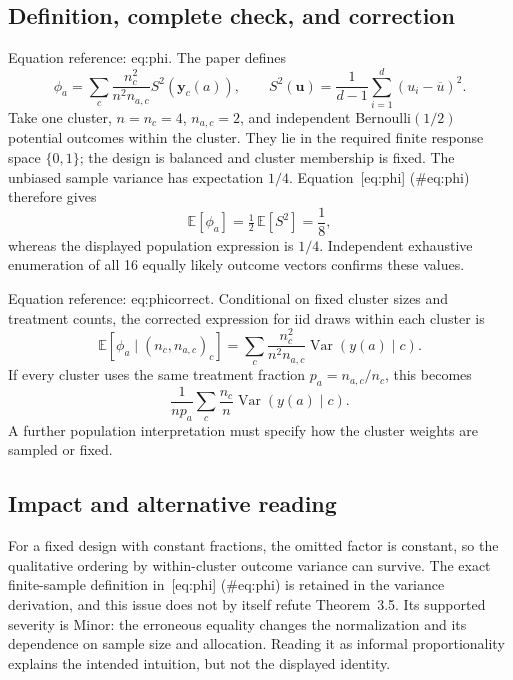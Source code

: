 \documentclass[10pt]{article}
\begin{document}
\subsection*{Definition, complete check, and correction}
Equation reference: eq:phi. The paper defines \[
 \phi_a=\sum_c\frac{n_c^2}{n^2n_{a,c}}S^2(\boldsymbol y_c(a)),
 \qquad
 S^2(\boldsymbol u)=\frac1{d-1}\sum_{i=1}^d(u_i-\overline u)^2.\] Take one cluster, \(n=n_c=4\), \(n_{a,c}=2\), and independent Bernoulli\((1/2)\) potential outcomes within the cluster. They lie in the required finite response space \(\{0,1\}\); the design is balanced and cluster membership is fixed. The unbiased sample variance has expectation \(1/4\). Equation [eq:phi] (\#eq:phi) therefore gives \[\mathbb E[\phi_a]=\tfrac12\,\mathbb E[S^2]=\frac18,\] whereas the displayed population expression is \(1/4\). Independent exhaustive enumeration of all 16 equally likely outcome vectors confirms these values.\par
Equation reference: eq:phicorrect. Conditional on fixed cluster sizes and treatment counts, the corrected expression for iid draws within each cluster is \[
 \mathbb E[\phi_a\mid(n_c,n_{a,c})_c]
 =\sum_c\frac{n_c^2}{n^2n_{a,c}}\operatorname{Var}(y(a)\mid c).\] If every cluster uses the same treatment fraction \(p_a=n_{a,c}/n_c\), this becomes \[\frac1{np_a}\sum_c\frac{n_c}{n}\operatorname{Var}(y(a)\mid c).\] A further population interpretation must specify how the cluster weights are sampled or fixed.\par
\subsection*{Impact and alternative reading}
For a fixed design with constant fractions, the omitted factor is constant, so the qualitative ordering by within-cluster outcome variance can survive. The exact finite-sample definition in [eq:phi] (\#eq:phi) is retained in the variance derivation, and this issue does not by itself refute Theorem 3.5. Its supported severity is Minor: the erroneous equality changes the normalization and its dependence on sample size and allocation. Reading it as informal proportionality explains the intended intuition, but not the displayed identity.\par
\end{document}
